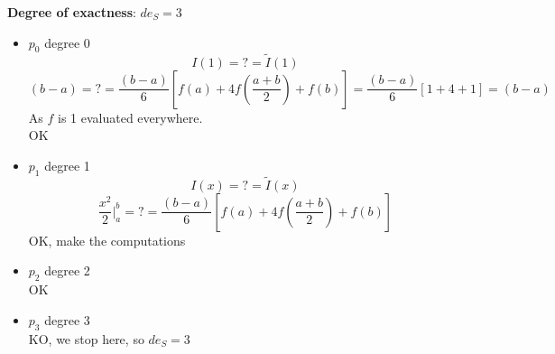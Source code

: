 \begin{itemize}
    \textbf{Degree of exactness}: $de_{S}=3$
    \begin{itemize}
        \item $p_0$ degree 0
        $$I(1)=?=\tilde{I}(1)$$
        $$
        (b-a)=?=
        \frac{(b-a)}{6}\left[
            f(a)+
            4f\left(\frac{a+b}{2}\right)+f(b)
        \right]=
        \frac{(b-a)}{6}\left[
            1+
            4+1
        \right]
        =(b-a)
        $$
        As $f$ is 1 evaluated everywhere.\\
        OK
        \item $p_1$ degree 1
        $$I(x)=?=\tilde{I}(x)$$
        $$
        \frac{x^2}{2}\Big|_a^b=?=
        \frac{(b-a)}{6}\left[
            f(a)+
            4f\left(\frac{a+b}{2}\right)+f(b)
        \right]
        $$
        OK, make the computations
        \item $p_2$ degree 2\\
        OK
        \item $p_3$ degree 3\\
        KO, we stop here, so $de_{S}=3$
    \end{itemize}
\end{itemize}

